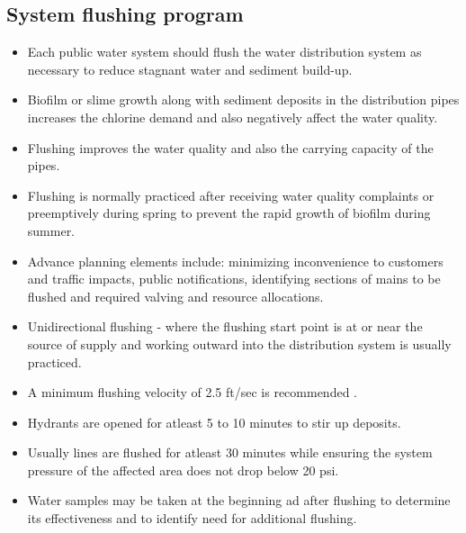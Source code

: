 \subsection{System flushing program} 
\begin{itemize}
\item Each public water system should flush the water distribution system as necessary to reduce stagnant water and sediment build-up.
\item Biofilm or slime growth along with sediment deposits in the distribution pipes increases the chlorine demand and also negatively affect the water quality.
\item Flushing improves the water quality and also the carrying capacity of the pipes.
\item Flushing is normally practiced after receiving water quality complaints or preemptively during spring to prevent the rapid growth of biofilm during summer.
\item Advance planning elements include: minimizing inconvenience to customers and traffic impacts, public notifications, identifying sections of mains to be flushed and required valving and resource allocations.
\item Unidirectional flushing - where the flushing start point is at or near the source of supply and working outward into the distribution system is usually practiced.
\item A minimum flushing velocity of 2.5 ft/sec is recommended .
\item Hydrants are opened for atleast 5 to 10 minutes to stir up deposits.
\item Usually lines are flushed for atleast 30 minutes while ensuring the system pressure of the affected area does not drop below 20 psi.
\item Water samples may be taken at the beginning ad after flushing to determine its effectiveness and to identify need for additional flushing.
\end{itemize}

